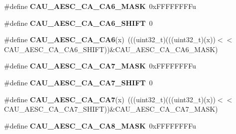 \begin{DoxyCompactItemize}
\item 
\#define {\bfseries C\+A\+U\+\_\+\+A\+E\+S\+C\+\_\+\+C\+A\+\_\+\+C\+A6\+\_\+\+M\+A\+SK}~0x\+F\+F\+F\+F\+F\+F\+F\+Fu\hypertarget{group__CAU__Register__Masks_ga12df900e0ab49a2eb0e596f184a22d02}{}\label{group__CAU__Register__Masks_ga12df900e0ab49a2eb0e596f184a22d02}

\item 
\#define {\bfseries C\+A\+U\+\_\+\+A\+E\+S\+C\+\_\+\+C\+A\+\_\+\+C\+A6\+\_\+\+S\+H\+I\+FT}~0\hypertarget{group__CAU__Register__Masks_gaa8448e0d27851e9f7c9277c78b46909f}{}\label{group__CAU__Register__Masks_gaa8448e0d27851e9f7c9277c78b46909f}

\item 
\#define {\bfseries C\+A\+U\+\_\+\+A\+E\+S\+C\+\_\+\+C\+A\+\_\+\+C\+A6}(x)~(((uint32\+\_\+t)(((uint32\+\_\+t)(x))$<$$<$C\+A\+U\+\_\+\+A\+E\+S\+C\+\_\+\+C\+A\+\_\+\+C\+A6\+\_\+\+S\+H\+I\+FT))\&C\+A\+U\+\_\+\+A\+E\+S\+C\+\_\+\+C\+A\+\_\+\+C\+A6\+\_\+\+M\+A\+SK)\hypertarget{group__CAU__Register__Masks_ga1a0bf645c20b2e4c7c6a238360e609f5}{}\label{group__CAU__Register__Masks_ga1a0bf645c20b2e4c7c6a238360e609f5}

\item 
\#define {\bfseries C\+A\+U\+\_\+\+A\+E\+S\+C\+\_\+\+C\+A\+\_\+\+C\+A7\+\_\+\+M\+A\+SK}~0x\+F\+F\+F\+F\+F\+F\+F\+Fu\hypertarget{group__CAU__Register__Masks_ga52597534749f65beb43a15fc74aafb0e}{}\label{group__CAU__Register__Masks_ga52597534749f65beb43a15fc74aafb0e}

\item 
\#define {\bfseries C\+A\+U\+\_\+\+A\+E\+S\+C\+\_\+\+C\+A\+\_\+\+C\+A7\+\_\+\+S\+H\+I\+FT}~0\hypertarget{group__CAU__Register__Masks_gaf1760cda5d2b0930cef17ec6966d81c1}{}\label{group__CAU__Register__Masks_gaf1760cda5d2b0930cef17ec6966d81c1}

\item 
\#define {\bfseries C\+A\+U\+\_\+\+A\+E\+S\+C\+\_\+\+C\+A\+\_\+\+C\+A7}(x)~(((uint32\+\_\+t)(((uint32\+\_\+t)(x))$<$$<$C\+A\+U\+\_\+\+A\+E\+S\+C\+\_\+\+C\+A\+\_\+\+C\+A7\+\_\+\+S\+H\+I\+FT))\&C\+A\+U\+\_\+\+A\+E\+S\+C\+\_\+\+C\+A\+\_\+\+C\+A7\+\_\+\+M\+A\+SK)\hypertarget{group__CAU__Register__Masks_gaed829e4b9b6913adaac02b6bbdff62f1}{}\label{group__CAU__Register__Masks_gaed829e4b9b6913adaac02b6bbdff62f1}

\item 
\#define {\bfseries C\+A\+U\+\_\+\+A\+E\+S\+C\+\_\+\+C\+A\+\_\+\+C\+A8\+\_\+\+M\+A\+SK}~0x\+F\+F\+F\+F\+F\+F\+F\+Fu\hypertarget{group__CAU__Register__Masks_ga7d4416b298869da3e7c79f6a3443f015}{}\label{group__CAU__Register__Masks_ga7d4416b298869da3e7c79f6a3443f015}


\end{DoxyCompactItemize}
